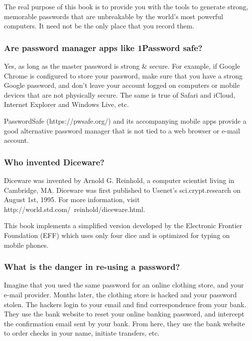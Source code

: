 The real purpose of this book is to provide you with the tools to generate strong, memorable passwords that are unbreakable by the world's most powerful computers. It need not be the only place that you record them.

\subsubsection{Are password manager apps like 1Password safe?}

Yes, as long as the master password is strong \& secure. For example, if Google Chrome is configured to store your password, make sure that you have a strong Google password, and don't leave your account logged on computers or mobile devices that are not physically secure. The same is true of Safari and iCloud, Internet Explorer and Windows Live, etc.

PasswordSafe (https://pwsafe.org/) and its accompanying mobile apps provide a good alternative password manager that is not tied to a web browser or e-mail account.

\subsubsection{Who invented Diceware?}

Diceware was invented by Arnold G. Reinhold, a computer scientist living in Cambridge, MA. Diceware was first published to Usenet's sci.crypt.research on August 1st, 1995. For more information, visit http://world.std.com/~reinhold/diceware.html. 

This book implements a simplified version developed by the Electronic Frontier Foundation (EFF) which uses only four dice and is optimized for typing on mobile phones.
 
\subsubsection{What is the danger in re-using a password?}

Imagine that you used the same password for an online clothing store, and your e-mail provider. Months later, the clothing store is hacked and your password stolen. The hackers login to your email and find correspondence from your bank. They use the bank website to reset your online banking password, and intercept the confirmation email sent by your bank. From here, they use the bank website to order checks in your name, initiate transfers, etc.

